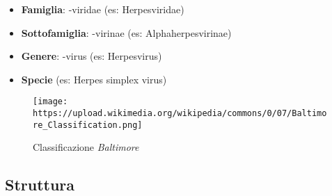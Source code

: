 \documentclass[italian,]{article}
\providecommand{\tightlist}{%
  \setlength{\itemsep}{0pt}\setlength{\parskip}{0pt}}
\newcommand{\normalbox}[2]{\begin{tcolorbox}[title=#1]#2\end{tcolorbox}} %
\begin{document}
\normalbox{Sistematica}{
\begin{itemize}
\tightlist
\item \textbf{Famiglia}: -viridae (es: Herpesviridae)
\item \textbf{Sottofamiglia}: -virinae (es: Alphaherpesvirinae)
\item \textbf{Genere}: -virus (es: Herpesvirus)
\item \textbf{Specie} (es: Herpes simplex virus)
\end{itemize}
}

\begin{figure}
\centering
\texttt{[image: https://upload.wikimedia.org/wikipedia/commons/0/07/Baltimore\_Classification.png]}
\caption{Classificazione \emph{Baltimore} \label{img-classbaltimore}}
\end{figure}

\hypertarget{struttura}{%
\subsection{Struttura}\label{struttura}}
\end{document}
